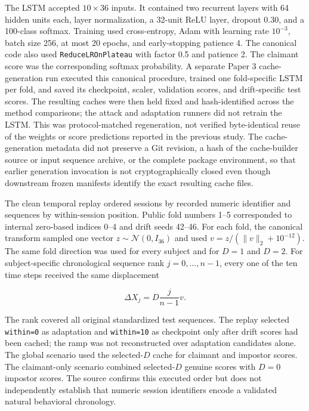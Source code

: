 \documentclass[technologies,supfile,submit,moreauthors]{Definitions/mdpi}
\begin{document}
The LSTM accepted \(10\times36\) inputs. It contained two recurrent layers with 64 hidden units each, layer normalization, a 32-unit ReLU layer, dropout 0.30, and a 100-class softmax. Training used cross-entropy, Adam with learning rate \(10^{-3}\), batch size 256, at most 20 epochs, and early-stopping patience 4. The canonical code also used \texttt{ReduceLROnPlateau} with factor 0.5 and patience 2. The claimant score was the corresponding softmax probability. A separate Paper 3 cache-generation run executed this canonical procedure, trained one fold-specific LSTM per fold, and saved its checkpoint, scaler, validation scores, and drift-specific test scores. The resulting caches were then held fixed and hash-identified across the method comparisons; the attack and adaptation runners did not retrain the LSTM. This was protocol-matched regeneration, not verified byte-identical reuse of the weights or score predictions reported in the previous study. The cache-generation metadata did not preserve a Git revision, a hash of the cache-builder source or input sequence archive, or the complete package environment, so that earlier generation invocation is not cryptographically closed even though downstream frozen manifests identify the exact resulting cache files.

The clean temporal replay ordered sessions by recorded numeric identifier and sequences by within-session position. Public fold numbers 1--5 corresponded to internal zero-based indices 0--4 and drift seeds 42--46. For each fold, the canonical transform sampled one vector \(z\sim\mathcal{N}(0,I_{36})\) and used \(v=z/(\lVert v\rVert_2+10^{-12})\). The same fold direction was used for every subject and for \(D=1\) and \(D=2\). For subject-specific chronological sequence rank \(j=0,\ldots,n-1\), every one of the ten time steps received the same displacement

\[
\Delta X_j=D\frac{j}{n-1}v.
\]

The rank covered all original standardized test sequences. The replay selected \texttt{within=0} as adaptation and \texttt{within=10} as checkpoint only after drift scores had been cached; the ramp was not reconstructed over adaptation candidates alone. The global scenario used the selected-\(D\) cache for claimant and impostor scores. The claimant-only scenario combined selected-\(D\) genuine scores with \(D=0\) impostor scores. The source confirms this executed order but does not independently establish that numeric session identifiers encode a validated natural behavioral chronology.
\end{document}
